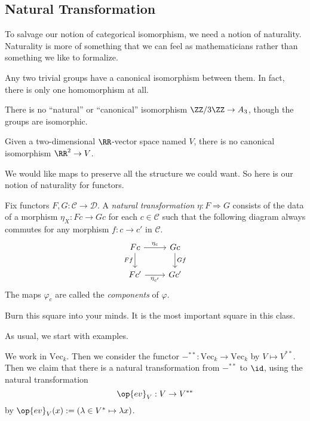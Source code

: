 \documentclass[../notes.tex]{subfiles}
\begin{document}
\subsection{Natural Transformation}
To salvage our notion of categorical isomorphism, we need a notion of naturality. Naturality is more of something that we can feel as mathematicians rather than something we like to formalize.
\begin{example}
	Any two trivial groups have a canonical isomorphism between them. In fact, there is only one homomorphism at all.
\end{example}
\begin{nex}
	There is no ``natural'' or ``canonical'' isomorphism $\ZZ/3\ZZ\to A_3$, though the groups are isomorphic.
\end{nex}
\begin{nex}
	Given a two-dimensional $\RR$-vector space named $V$, there is no canonical isomorphism $\RR^2\to V$.
\end{nex}
We would like maps to preserve all the structure we could want. So here is our notion of naturality for functors.
\begin{definition}
	Fix functors $F,G:\mathcal C\to\mathcal D$. A \textit{natural transformation} $\eta:F\Rightarrow G$ consists of the data of a morphism $\eta_X:Fc\to Gc$ for each $c\in\mathcal C$ such that the following diagram always commutes for any morphism $f:c\to c'$ in $\mathcal C$.
	\[\begin{tikzcd}
		Fc & Gc \\
		{Fc'} & {Gc'}
		\arrow["Ff"', from=1-1, to=2-1]
		\arrow["Gf", from=1-2, to=2-2]
		\arrow["{\eta_c}", from=1-1, to=1-2]
		\arrow["{\eta_{c'}}"', from=2-1, to=2-2]
	\end{tikzcd}\]
	The maps $\varphi_c$ are called the \textit{components} of $\varphi$.
\end{definition}
\begin{quot}
	Burn this square into your minds. It is the most important square in this class.
\end{quot}
As usual, we start with examples.
\begin{exe}
	We work in $\mathrm{Vec}_k$. Then we consider the functor $-^{**}:\mathrm{Vec}_k\to\mathrm{Vec}_k$ by $V\mapsto V^{**}$. Then we claim that there is a natural transformation from $-^{**}$ to $\id$, using the natural transformation
	\[\op{ev}_V:V\to V^{**}\]
	by $\op{ev}_V(x):=(\lambda\in V^*\mapsto\lambda x)$.
\end{exe}
\end{document}
